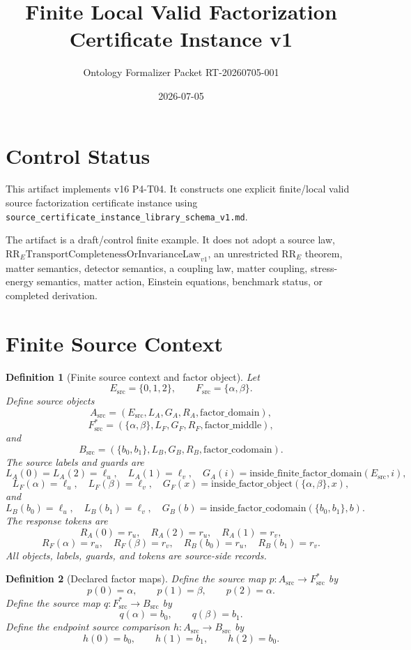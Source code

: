 \documentclass[11pt]{article}
\title{Finite Local Valid Factorization Certificate Instance v1}
\author{Ontology Formalizer Packet RT-20260705-001}
\date{2026-07-05}
\newcommand{\Esrc}{E_{\mathrm{src}}}
\newcommand{\Fsrc}{F_{\mathrm{src}}}
\newcommand{\Asrc}{A_{\mathrm{src}}}
\newcommand{\Bsrc}{B_{\mathrm{src}}}
\newcommand{\RRE}{\mathrm{RR}_{E}}
\newcommand{\RRELaw}{\mathrm{RR}_{E}\mathrm{TransportCompletenessOrInvarianceLaw}_{v1}}
\newtheorem{definition}{Definition}
\begin{document}
\maketitle

\section{Control Status}

This artifact implements v16 P4-T04. It constructs one explicit finite/local
valid source factorization certificate instance using
\texttt{source\_certificate\_instance\_library\_schema\_v1.md}.

The artifact is a draft/control finite example. It does not adopt a source
law, \(\RRELaw\), an unrestricted \(\RRE\) theorem, matter semantics,
detector semantics, a coupling law, matter coupling, stress-energy semantics,
matter action, Einstein equations, benchmark status, or completed derivation.

\section{Finite Source Context}

\begin{definition}[Finite source context and factor object]
Let
\[
  \Esrc=\{0,1,2\},\qquad \Fsrc=\{\alpha,\beta\}.
\]
Define source objects
\[
  \Asrc=(\Esrc,L_A,G_A,R_A,\mathrm{factor\_domain}),
\]
\[
  \Fsrc^{\ast}=(\{\alpha,\beta\},L_F,G_F,R_F,\mathrm{factor\_middle}),
\]
and
\[
  \Bsrc=(\{b_0,b_1\},L_B,G_B,R_B,\mathrm{factor\_codomain}).
\]
The source labels and guards are
\[
  L_A(0)=L_A(2)=\ell_u,\quad L_A(1)=\ell_v,\quad
  G_A(i)=\mathrm{inside\_finite\_factor\_domain}(\Esrc,i),
\]
\[
  L_F(\alpha)=\ell_u,\quad L_F(\beta)=\ell_v,\quad
  G_F(x)=\mathrm{inside\_factor\_object}(\{\alpha,\beta\},x),
\]
and
\[
  L_B(b_0)=\ell_u,\quad L_B(b_1)=\ell_v,\quad
  G_B(b)=\mathrm{inside\_factor\_codomain}(\{b_0,b_1\},b).
\]
The response tokens are
\[
  R_A(0)=r_u,\quad R_A(2)=r_u,\quad R_A(1)=r_v,
\]
\[
  R_F(\alpha)=r_u,\quad R_F(\beta)=r_v,\quad
  R_B(b_0)=r_u,\quad R_B(b_1)=r_v.
\]
All objects, labels, guards, and tokens are source-side records.
\end{definition}

\begin{definition}[Declared factor maps]
Define the source map \(p:\Asrc\to\Fsrc^{\ast}\) by
\[
  p(0)=\alpha,\qquad p(1)=\beta,\qquad p(2)=\alpha.
\]
Define the source map \(q:\Fsrc^{\ast}\to\Bsrc\) by
\[
  q(\alpha)=b_0,\qquad q(\beta)=b_1.
\]
Define the endpoint source comparison \(h:\Asrc\to\Bsrc\) by
\[
  h(0)=b_0,\qquad h(1)=b_1,\qquad h(2)=b_0.
\]
\end{definition}
\end{document}
